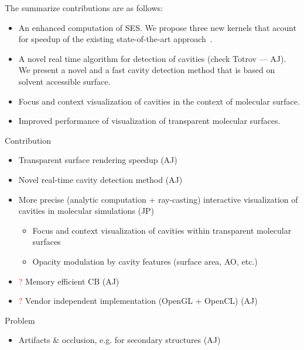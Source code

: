The summarize contributions are as follows:
\begin{itemize}
  \item An enhanced computation of SES. We propose three new kernels that acount for speedup of the existing state-of-the-art approach~\cite{todo}.
  \item A novel real time algorithm for detection of cavities (check Totrov --- AJ). We present a novel and a fast cavity detection method that is based on solvent accessible surface.
  \item Focus and context visualization of cavities in the context of molecular surface.
  \item Improved performance of visualization of transparent molecular surfaces.
\end{itemize}

Contribution
\begin{itemize}
  \item Transparent surface rendering speedup (AJ)
	\item Novel real-time cavity detection method (AJ)
	\item More precise (analytic computation + ray-casting) interactive visualization of cavities in molecular simulations (JP)
	\begin{itemize}
		\item Focus and context visualization of cavities within transparent molecular surfaces
		\item Opacity modulation by cavity features (surface area, AO, etc.)
	\end{itemize}
	\item \textcolor{red}{?} Memory efficient CB (AJ)
	\item \textcolor{red}{?} Vendor independent implementation (OpenGL + OpenCL) (AJ)
\end{itemize}

Problem
\begin{itemize}
  \item Artifacts \& occlusion, e.g. for secondary structures (AJ)
\end{itemize}


